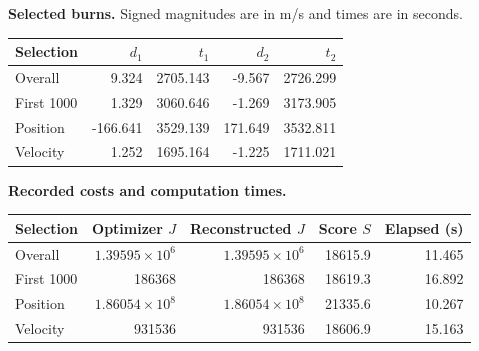 \par\noindent\textbf{Selected burns.} Signed magnitudes are in m/s and times are in seconds.
\begin{center}
\begin{tabular}{lrrrr}
\toprule
Selection & $d_1$ & $t_1$ & $d_2$ & $t_2$\\
\midrule
Overall & 9.324 & 2705.143 & -9.567 & 2726.299\\
First 1000 & 1.329 & 3060.646 & -1.269 & 3173.905\\
Position & -166.641 & 3529.139 & 171.649 & 3532.811\\
Velocity & 1.252 & 1695.164 & -1.225 & 1711.021\\
\bottomrule
\end{tabular}
\end{center}
\par\noindent\textbf{Recorded costs and computation times.}
\begin{center}
\begin{tabular}{lrrrr}
\toprule
Selection & Optimizer $J$ & Reconstructed $J$ & Score $S$ & Elapsed (s)\\
\midrule
Overall & $1.39595\times10^{6}$ & $1.39595\times10^{6}$ & 18615.9 & 11.465\\
First 1000 & 186368 & 186368 & 18619.3 & 16.892\\
Position & $1.86054\times10^{8}$ & $1.86054\times10^{8}$ & 21335.6 & 10.267\\
Velocity & 931536 & 931536 & 18606.9 & 15.163\\
\bottomrule
\end{tabular}
\end{center}
\clearpage
